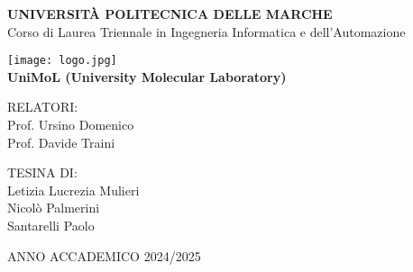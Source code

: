 \documentclass[11pt,a4paper]{report}
\begin{document}
\begin{titlepage}
  \vspace*{-1cm}
  \begin{center}
    \textbf{\textcolor{upmred}{\LARGE UNIVERSITÀ POLITECNICA DELLE MARCHE}}\\[0.3cm]
    \large Corso di Laurea Triennale in Ingegneria Informatica e dell'Automazione
    \vspace{0.5cm}

    \texttt{[image: logo.jpg]} \\[0.7in]

    {\Large\textbf{\textcolor{upmred}{UniMoL (University Molecular Laboratory)}}}
    \vspace{0.4in}

\noindent
\begin{minipage}[t]{0.48\textwidth}
  {\Large\textcolor{upmred}{RELATORI:} \\[0.3cm]
  Prof. Ursino Domenico \\
  Prof. Davide Traini}
\end{minipage}
\hfill
\begin{minipage}[t]{0.48\textwidth}
  {\Large\textcolor{upmred}{TESINA DI:} \\[0.3cm]
  Letizia Lucrezia Mulieri \\
  Nicolò Palmerini \\
  Santarelli Paolo}
\end{minipage}


    \vspace{1in}

    {\Large ANNO ACCADEMICO 2024/2025}
  \end{center}
\end{titlepage}

\tableofcontents
\end{document}
